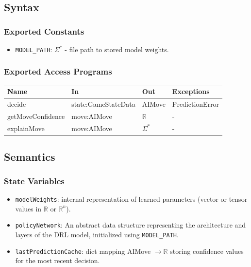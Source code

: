 \documentclass[12pt, titlepage]{article}
\begin{document}
\subsection{Syntax}

\subsubsection{Exported Constants}
\begin{itemize}
\item \texttt{MODEL\_PATH}: $\Sigma^{*}$ - file path to stored model weights.
\end{itemize}

\subsubsection{Exported Access Programs}
\begin{center}
\begin{tabular}{p{5cm} p{4cm} p{4cm} p{3cm}}
\hline
\textbf{Name} & \textbf{In} & \textbf{Out} & \textbf{Exceptions} \\
\hline
decide & state:GameStateData & AIMove & PredictionError \\
getMoveConfidence & move:AIMove & $\mathbb{R}$ & - \\
explainMove & move:AIMove & $\Sigma^{*}$ & - \\
\hline
\end{tabular}
\end{center}

\subsection{Semantics}

\subsubsection{State Variables}
\begin{itemize}
\item \texttt{modelWeights}: internal representation of learned parameters  
      (vector or tensor values in $\mathbb{R}$ or $\mathbb{R}^{n}$).

\item \texttt{policyNetwork}: An abstract data structure representing the architecture and layers of the DRL model, initialized using \texttt{MODEL\_PATH}.

\item \texttt{lastPredictionCache}: dict mapping AIMove $\rightarrow \mathbb{R}$  
      storing confidence values for the most recent decision.
\end{itemize}
\end{document}
